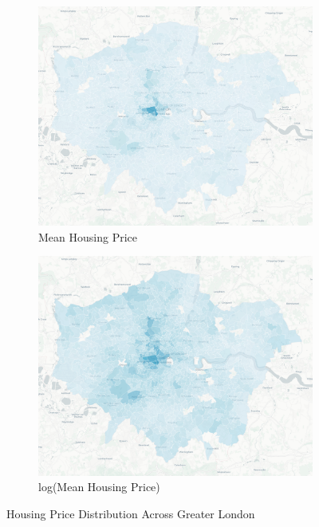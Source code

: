 \documentclass{article}
\begin{document}
\begin{figure}[H]
  \centering
  \begin{subfigure}{.45\textwidth}
      \centering
      \includegraphics[width=.95\linewidth]{images/housing_raw_mean.png}
      \caption{Mean Housing Price}
      \label{fig:1(a)}
  \end{subfigure}
  \begin{subfigure}{.45\textwidth}
      \centering
      \includegraphics[width=.95\linewidth]{images/housing_log_mean.png}
      \caption{log(Mean Housing Price)}
      \label{fig:1(b)}
  \end{subfigure}
  \caption{Housing Price Distribution Across Greater London}
  \label{fig:price_distribution}
\end{figure}
\end{document}
